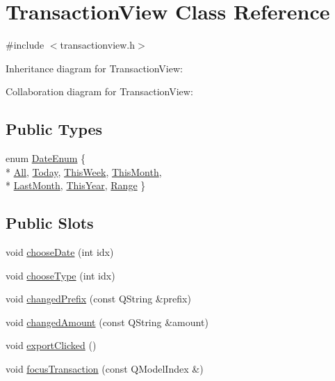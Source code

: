 \hypertarget{class_transaction_view}{}\section{Transaction\+View Class Reference}
\label{class_transaction_view}


{\ttfamily \#include $<$transactionview.\+h$>$}



Inheritance diagram for Transaction\+View\+:


Collaboration diagram for Transaction\+View\+:
\subsection*{Public Types}
\begin{DoxyCompactItemize}
\item 
enum \hyperlink{class_transaction_view_a73d1bbedc72fa131591aadb3aba150f8}{Date\+Enum} \{ \\*
\hyperlink{class_transaction_view_a73d1bbedc72fa131591aadb3aba150f8a4c8bf710ad7b3be71d6da978c62e49fe}{All}, 
\hyperlink{class_transaction_view_a73d1bbedc72fa131591aadb3aba150f8af944f2a9373333fc348d517aad15fd93}{Today}, 
\hyperlink{class_transaction_view_a73d1bbedc72fa131591aadb3aba150f8ad690fc9e22dbb55e86f2198553d26bec}{This\+Week}, 
\hyperlink{class_transaction_view_a73d1bbedc72fa131591aadb3aba150f8a34f3d05ba9262c629e7d6a4e809ab927}{This\+Month}, 
\\*
\hyperlink{class_transaction_view_a73d1bbedc72fa131591aadb3aba150f8ab119e2fd1a4a132c780c82cfe982f218}{Last\+Month}, 
\hyperlink{class_transaction_view_a73d1bbedc72fa131591aadb3aba150f8a783e0105c0ec8447b33a84ce44951eb5}{This\+Year}, 
\hyperlink{class_transaction_view_a73d1bbedc72fa131591aadb3aba150f8a5282c94849c51ee19eaa9cf929428b10}{Range}
 \}
\end{DoxyCompactItemize}
\subsection*{Public Slots}
\begin{DoxyCompactItemize}
\item 
void \hyperlink{class_transaction_view_abd49a0777b14f7bf5a72a4d5901d033d}{choose\+Date} (int idx)
\item 
void \hyperlink{class_transaction_view_a590f0edc4ab4d59f88d7fc494e852f80}{choose\+Type} (int idx)
\item 
void \hyperlink{class_transaction_view_ac2ed41556913e588c667490860717efa}{changed\+Prefix} (const Q\+String \&prefix)
\item 
void \hyperlink{class_transaction_view_a0075048c06bb54da5c5e5d2691198984}{changed\+Amount} (const Q\+String \&amount)
\item 
void \hyperlink{class_transaction_view_a5983022ff1e5395f87de3c5728eff8da}{export\+Clicked} ()
\item 
void \hyperlink{class_transaction_view_ab6d126806467ae9dc273cbe19a7477cc}{focus\+Transaction} (const Q\+Model\+Index \&)
\end{DoxyCompactItemize}
